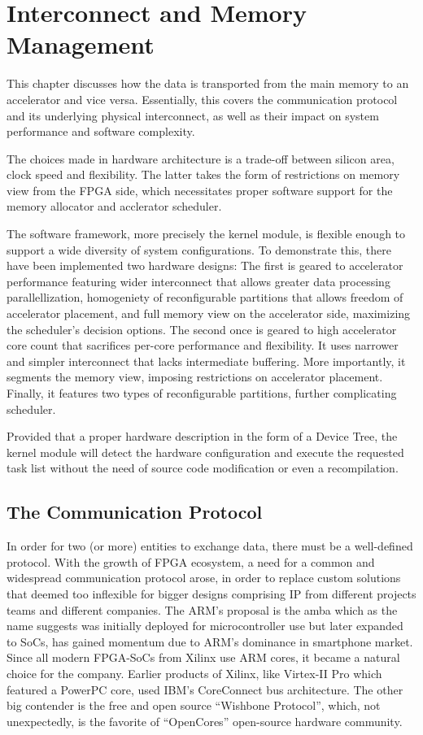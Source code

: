 \chapter{Interconnect and Memory Management}
\label{chap:interconnect}

This chapter discusses how the data is transported 
from the main memory to an accelerator and vice versa. 
Essentially, this covers the communication protocol 
and its underlying physical interconnect, 
as well as their impact on system performance 
and software complexity.

The choices made in hardware architecture is 
a trade-off between silicon area, clock speed and flexibility. 
The latter takes the form of restrictions on memory view from the FPGA side, 
which necessitates proper software support 
for the memory allocator and acclerator scheduler.

The software framework, more precisely the kernel module,
is flexible enough to support a wide diversity of system configurations. 
To demonstrate this, there have been implemented two hardware designs: 
The first is geared to accelerator performance featuring wider interconnect that 
allows greater data processing parallellization,
homogeniety of reconfigurable partitions that allows freedom of accelerator placement, 
and full memory view on the accelerator side, maximizing the scheduler's decision options.
The second once is geared to high accelerator core count 
that sacrifices per-core performance and flexibility.
It uses narrower and simpler interconnect that lacks intermediate buffering. 
More importantly, it segments the memory view, 
imposing restrictions on accelerator placement. 
Finally, it features two types of reconfigurable partitions,
further complicating scheduler.

Provided that a proper hardware description 
in the form of a Device Tree\cite{devicetree}, 
the kernel module will detect the hardware 
configuration and execute the requested task list 
without the need of source code modification or even a recompilation.

\section{The Communication Protocol}

In order for two (or more) entities to exchange data, 
there must be a well-defined protocol.
With the growth of FPGA ecosystem, a need for a common 
and widespread communication protocol arose,
in order to replace custom solutions that deemed 
too inflexible for bigger designs comprising IP
from different projects teams and different companies.
The ARM's proposal is the \gls{amba}\cite{amba} 
which as the name suggests was initially deployed 
for microcontroller use but later expanded to SoCs,
has gained momentum due to ARM's dominance in smartphone market. 
Since all modern FPGA-SoCs from Xilinx use ARM cores, 
it became a natural choice for the company. 
Earlier products of Xilinx, like Virtex-II Pro which
featured a PowerPC core, used IBM's CoreConnect bus architecture. 
The other big contender is the free and open source ``Wishbone Protocol'', 
which, not unexpectedly, is the favorite of 
``OpenCores'' open-source hardware community.


